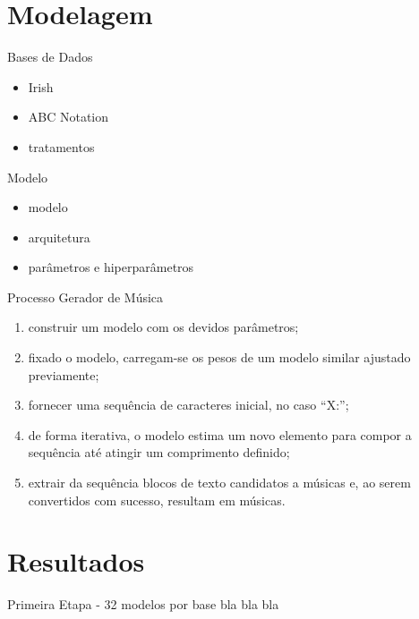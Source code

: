 \documentclass{beamer}
\begin{document}
\section{Modelagem}
    \begin{frame}{Bases de Dados}
        \begin{itemize}
            \item Irish
            \item ABC Notation
            \item tratamentos
        \end{itemize}
    \end{frame}

    \begin{frame}{Modelo}
        \begin{itemize}
            \item modelo
            \item arquitetura
            \item parâmetros e hiperparâmetros
        \end{itemize}
    \end{frame}
    
    \begin{frame}{Processo Gerador de Música}
        \begin{enumerate}
            \justifying
            \item construir um modelo com os devidos parâmetros; 
            \item fixado o modelo, carregam-se os pesos de um modelo similar ajustado previamente;
            \item fornecer uma sequência de caracteres inicial, no caso ``X:'';
            \item de forma iterativa, o modelo estima um novo elemento para compor a sequência até atingir um comprimento definido;
            \item extrair da sequência blocos de texto candidatos a músicas e, ao serem convertidos com sucesso, resultam em músicas.
        \end{enumerate}
    \end{frame}



\section{Resultados}
    \begin{frame}{Primeira Etapa - 32 modelos por base}
        bla bla bla
    \end{frame}
\end{document}
